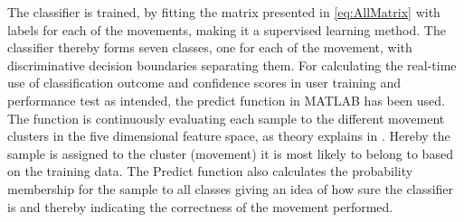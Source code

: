 \normalsize
The classifier is trained, by fitting the matrix presented in \eqref{eq:AllMatrix} with labels for each of the movements, making it a supervised learning method. The classifier thereby forms seven classes, one for each of the movement, with discriminative decision boundaries separating them. For calculating the real-time use of classification outcome and confidence scores in user training and performance test as intended, the predict function in MATLAB has been used. The function is continuously evaluating each sample to the different movement clusters in the five dimensional feature space, as theory explains in . Hereby the sample is assigned to the cluster (movement) it is most likely to belong to based on the training data. The Predict function also calculates the probability membership for the sample to all classes giving an idea of how sure the classifier is and thereby indicating the correctness of the movement performed. 


